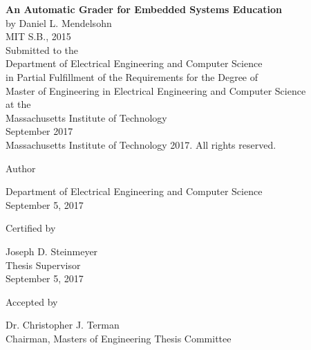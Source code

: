\documentclass[12pt]{article}
\newcommand{\mytitle}{\textbf{An Automatic Grader for Embedded Systems Education}}
\newcommand{\mydate}{September 5, 2017}
\begin{document}
\begin{titlepage}

\centering
\mytitle \\
\vspace{12pt}
by Daniel L. Mendelsohn \\
MIT S.B., 2015 \\
\vspace{12pt}
Submitted to the \\
Department of Electrical Engineering and Computer Science \\
in Partial Fulfillment of the Requirements for the Degree of \\
\vspace{12pt}
Master of Engineering in Electrical Engineering and Computer Science \\
\vspace{12pt}
at the \\
\vspace{12pt}
Massachusetts Institute of Technology \\
\vspace{12pt}
September 2017 \\
\vspace{12pt}
\textcopyright \hspace{0.05in} Massachusetts Institute of Technology 2017.  All rights reserved. \\
\vspace{48pt}

Author \dotfill \\
\begin{flushright}
Department of Electrical Engineering and Computer Science \\
\mydate
\end{flushright}
\vspace{36pt}

Certified by \dotfill \\
\begin{flushright}
Joseph D. Steinmeyer \\
Thesis Supervisor \\
\mydate
\end{flushright}
\vspace{24pt}

Accepted by \dotfill \\
\begin{flushright}
Dr. Christopher J. Terman \\
Chairman, Masters of Engineering Thesis Committee
\end{flushright}

\end{titlepage}
\end{document}

